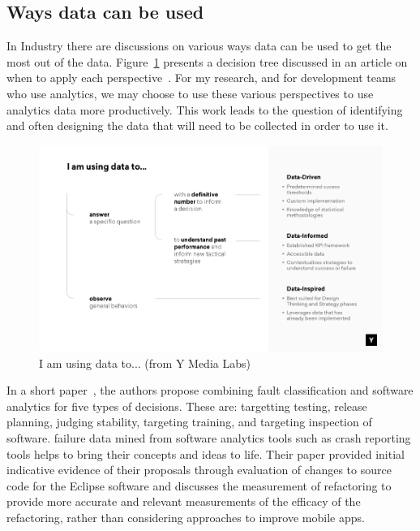 \subsection{Ways data can be used}
In Industry there are discussions on various ways data can be used to get the most out of the data. Figure~\ref{fig:i_am_using_data_to} presents a decision tree discussed in an article on when to apply each perspective~\cite{amplitude_are_you_data_driven}. For my research, and for development teams who use analytics, we may choose to use these various perspectives to use analytics data more productively. This work leads to the question of identifying and often designing the data that will need to be collected in order to use it.

\begin{figure}[ht]
    \centering
    \includegraphics[width=15cm]{images/data-informed-graphic-ymedia-labs.png}
    \caption{I am using data to... (from Y Media Labs)~\cite{amplitude_are_you_data_driven}}
    \label{fig:i_am_using_data_to}
\end{figure}


In a short paper~\citep{kidwell2015_toward_fault_taxonomy_application_of_software_analytics}, the authors propose combining fault classification and software analytics for five types of decisions. These are: targetting testing, release planning, judging stability, targeting training, and targeting inspection of software. failure data mined from software analytics tools such as crash reporting tools helps to bring their concepts and ideas to life. Their paper provided initial indicative evidence of their proposals through evaluation of changes to source code for the Eclipse software and discusses the measurement of refactoring to provide more accurate and relevant measurements of the efficacy of the refactoring, rather than considering approaches to improve mobile apps.

